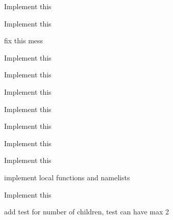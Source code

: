 \begin{DoxyRefList}
Implement this  
\item[\label{todo__todo000011}%
\hypertarget{todo__todo000011}{}%
Member \hyperlink{classNode_a8dad370be1595f49e0a7c2406a91e867a9b98ce84dc5f406e0743acc13f03aaf6}{Node\+:\+:Double\+Dot} ]Implement this  
\item[\label{todo__todo000018}%
\hypertarget{todo__todo000018}{}%
Member \hyperlink{classNode_ad2758f63dc60560b83e1d8a038df6e86}{Node\+:\+:execute} (\hyperlink{classEnvironment}{Environment} \&env)]fix this mess  
\item[\label{todo__todo000010}%
\hypertarget{todo__todo000010}{}%
Member \hyperlink{classNode_a8dad370be1595f49e0a7c2406a91e867a12f1dc625982c23638509a4039543b59}{Node\+:\+:Field\+Element} ]Implement this  
\item[\label{todo__todo000007}%
\hypertarget{todo__todo000007}{}%
Member \hyperlink{classNode_a8dad370be1595f49e0a7c2406a91e867a496a823a62742a6ebb9f4fb757e02ce4}{Node\+:\+:Function\+Name} ]Implement this  
\item[\label{todo__todo000012}%
\hypertarget{todo__todo000012}{}%
Member \hyperlink{classNode_a8dad370be1595f49e0a7c2406a91e867ad05e3fa202cceccd870b5aac8467623c}{Node\+:\+:Hash} ]Implement this  
\item[\label{todo__todo000008}%
\hypertarget{todo__todo000008}{}%
Member \hyperlink{classNode_a8dad370be1595f49e0a7c2406a91e867a1a3ec9cbafad290cdd86122121b61391}{Node\+:\+:List\+Name} ]Implement this  
\item[\label{todo__todo000013}%
\hypertarget{todo__todo000013}{}%
Member \hyperlink{classNode_a8dad370be1595f49e0a7c2406a91e867a183ed1e4cc2be1e5df44762c452281ef}{Node\+:\+:Name} ]Implement this  
\item[\label{todo__todo000014}%
\hypertarget{todo__todo000014}{}%
Member \hyperlink{classNode_a8dad370be1595f49e0a7c2406a91e867aab13754f7d035f904f4fc861bc6ad211}{Node\+:\+:Return} ]Implement this  
\item[\label{todo__todo000009}%
\hypertarget{todo__todo000009}{}%
Member \hyperlink{classNode_a8dad370be1595f49e0a7c2406a91e867a82f82cd405ee2ded93d8f9133e2f5f34}{Node\+:\+:Stat} ]Implement this  
\item[\label{todo__todo000005}%
\hypertarget{todo__todo000005}{}%
Member \hyperlink{classNode_a8dad370be1595f49e0a7c2406a91e867}{Node\+:\+:Type} ]implement local functions and namelists  
\item[\label{todo__todo000006}%
\hypertarget{todo__todo000006}{}%
Member \hyperlink{classNode_a8dad370be1595f49e0a7c2406a91e867a8fb6b35a2762acd63c8d42fc8575889e}{Node\+:\+:Variable\+List} ]Implement this  
\item[\label{todo__todo000017}%
\hypertarget{todo__todo000017}{}%
Class \hyperlink{classTest}{Test} ]add test for number of children, test can have max 2 
\end{DoxyRefList}
